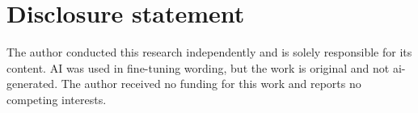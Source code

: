 \section*{Disclosure statement}

The author conducted this research independently and is solely responsible for its content. AI was used in fine-tuning wording, but the work is original and not ai-generated. The author received no funding for this work and reports no competing interests.
